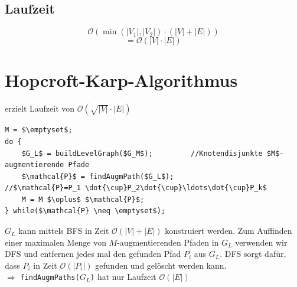  \subsection{Laufzeit}
 \[ \mathcal{O}\left( \min(|V_1|,|V_2|)\cdot(|V|+|E|) \right)\]
 \[ =\mathcal{O}(|V|\cdot|E|) \]
 \section{Hopcroft-Karp-Algorithmus}
 erzielt Laufzeit von $\mathcal{O}(\sqrt{|V|}\cdot |E|)$\\
 \begin{lstlisting}[style = pseudo]
M = $\emptyset$;
do {
	$G_L$ = buildLevelGraph($G_M$);			//Knotendisjunkte $M$-augmentierende Pfade
	$\mathcal{P}$ = findAugmPath($G_L$);				//$\mathcal{P}=P_1 \dot{\cup}P_2\dot{\cup}\ldots\dot{\cup}P_k$
	M = M $\oplus$ $\mathcal{P}$;
} while($\mathcal{P} \neq \emptyset$);
 \end{lstlisting}
 $G_L$ kann mittels BFS in Zeit $\mathcal{O} (|V|+|E|)$ konstruiert werden. Zum Auffinden einer maximalen Menge von $M$-augmentierenden Pfaden in $G_L$ verwenden wir DFS und entfernen jedes mal den gefunden Pfad $P_i$ aus $G_L$. DFS sorgt dafür, dass $P_i$ in Zeit $\mathcal{O}(|P_i|)$ gefunden und gelöscht werden kann.\\
 $\Rightarrow$ \texttt{findAugmPaths($G_L$)} hat nur Laufzeit $\mathcal{O}(|E|)$